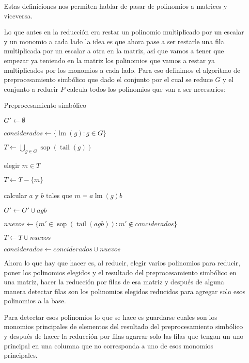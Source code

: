 \documentclass{report}
\theoremstyle{customstyle}
\theoremstyle{factstyle}
\DeclareMathOperator{\sop}{sop}
\DeclareMathOperator{\lm}{lm}
\DeclareMathOperator{\tail}{tail}
\begin{document}
Estas definiciones nos permiten hablar de pasar de polinomios a matrices y viceversa.

Lo que antes en la reducción era restar un polinomio multiplicado por un escalar y un monomio a cada lado la idea es que ahora pase a ser restarle una fila multiplicada por un escalar a otra en la matriz, así que vamos a tener que empezar ya teniendo en la matriz los polinomios que vamos a restar ya multiplicados por los monomios a cada lado. Para eso definimos el algoritmo de preprocesamiento simbólico que dado el conjunto por el cual se reduce $G$ y el conjunto a reducir $P$ calcula todos los polinomios que van a ser necesarios:

\begin{algorithm}[H] %
  \caption{Preprocesamiento simbólico}\label{alg:Preprocesamiento simbólico}
  $G' ← ∅$

  $conciderados ← \{\lm(g) : g ∈ G\}$

  $T ← ⋃_{g ∈ G} \sop(\tail(g))$

   {
    elegir $m ∈ T$

    $T ← T - \{m\}$

     {
      \If{$\lm(g) | m$} {
        calcular $a$ y $b$ tales que $m = a \lm(g) b$

        $G' ← G' ∪ {agb}$

        $nuevos ← \{m' ∈ \sop(\tail(agb)) : m' ∉ conciderados\}$

        $T ← T ∪ nuevos$

        $conciderados ← conciderados ∪ nuevos$
      }
    }
  }

\end{algorithm}

Ahora lo que hay que hacer es, al reducir, elegir varios polinomios para reducir, poner los polinomios elegidos y el resultado del preprocesamiento simbólico en una matriz, hacer la reducción por filas de esa matriz y después de alguna manera detectar filas son los polinomios elegidos reducidos para agregar solo esos polinomios a la base.

Para detectar esos polinomios lo que se hace es guardarse cuales son los monomios principales de elementos del resultado del preprocesamiento simbólico y después de hacer la reducción por filas agarrar solo las filas que tengan un uno principal en una columna que no corresponda a uno de esos monomios principales.
\end{document}
